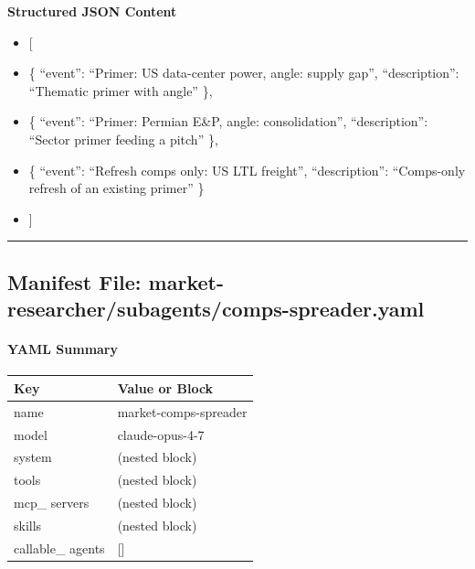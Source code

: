 \documentclass[11pt]{article}
\begin{document}
\textbf{Structured JSON Content}
\begin{itemize}[leftmargin=*,itemsep=2pt,topsep=2pt]
\item {} [
\item {} \{ ``event'': ``Primer: US data-center power, angle: supply gap'', ``description'': ``Thematic primer with angle'' \},
\item {} \{ ``event'': ``Primer: Permian E\&P, angle: consolidation'', ``description'': ``Sector primer feeding a pitch'' \},
\item {} \{ ``event'': ``Refresh comps only: US LTL freight'', ``description'': ``Comps-only refresh of an existing primer'' \}
\item {} ]
\end{itemize}

\vspace{0.8em}\hrule\vspace{0.8em}

\subsection{Manifest File: market-researcher/subagents/comps-spreader.yaml}\label{file:market-researcher-subagents-comps-spreader-yaml}

\paragraph{YAML Summary}\mbox{}\par
\begingroup
\small
\setlength{\tabcolsep}{2pt}
\begin{longtable}{>{\RaggedRight\arraybackslash\hspace{0pt}}p{}>{\RaggedRight\arraybackslash\hspace{0pt}}p{}}
\toprule
{} \textbf{Key} & \textbf{Value or Block} \\
\midrule
{} name & market-comps-spreader \\
{} model & claude-opus-4-7 \\
{} system & (nested block) \\
{} tools & (nested block) \\
{} mcp\_\allowbreak{} servers & (nested block) \\
{} skills & (nested block) \\
{} callable\_\allowbreak{} agents & [] \\
\bottomrule
\end{longtable}
\endgroup
\end{document}
